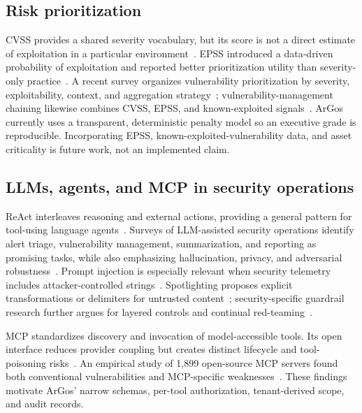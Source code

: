 \documentclass[conference,a4paper]{IEEEtran}
\newcommand{\argos}{ArGos\xspace}
\begin{document}
\subsection{Risk prioritization}

CVSS provides a shared severity vocabulary, but its score is not a direct estimate of exploitation in a particular environment~\cite{Mell2006CVSS,Scarfone2009CVSS}. EPSS introduced a data-driven probability of exploitation and reported better prioritization utility than severity-only practice~\cite{Jacobs2021EPSS}. A recent survey organizes vulnerability prioritization by severity, exploitability, context, and aggregation strategy~\cite{Jiang2025Prioritization}; vulnerability-management chaining likewise combines CVSS, EPSS, and known-exploited signals~\cite{Shimizu2025Chaining}. \argos currently uses a transparent, deterministic penalty model so an executive grade is reproducible. Incorporating EPSS, known-exploited-vulnerability data, and asset criticality is future work, not an implemented claim.

\subsection{LLMs, agents, and MCP in security operations}

ReAct interleaves reasoning and external actions, providing a general pattern for tool-using language agents~\cite{Yao2023ReAct}. Surveys of LLM-assisted security operations identify alert triage, vulnerability management, summarization, and reporting as promising tasks, while also emphasizing hallucination, privacy, and adversarial robustness~\cite{Habibzadeh2025LLMSOC,Srinivas2025AISOC}. Prompt injection is especially relevant when security telemetry includes attacker-controlled strings~\cite{Greshake2023Indirect}. Spotlighting proposes explicit transformations or delimiters for untrusted content~\cite{Hines2024Spotlighting}; security-specific guardrail research further argues for layered controls and continual red-teaming~\cite{Ali2026SecureCAI}.

MCP standardizes discovery and invocation of model-accessible tools. Its open interface reduces provider coupling but creates distinct lifecycle and tool-poisoning risks~\cite{Hou2025MCP}. An empirical study of 1,899 open-source MCP servers found both conventional vulnerabilities and MCP-specific weaknesses~\cite{Hasan2026MCP}. These findings motivate \argos' narrow schemas, per-tool authorization, tenant-derived scope, and audit records.
\end{document}
